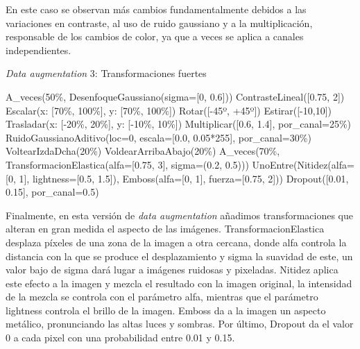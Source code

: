 En este caso se observan más cambios fundamentalmente debidos a las variaciones en contraste, al uso de ruido gaussiano y a la multiplicación, responsable de los cambios de color, ya que a veces se aplica a canales independientes. 

\begin{algorithm}[H]
    \caption{\textit{Data augmentation} 3: Transformaciones fuertes}
\begin{algorithmic}[1]
    \State A\_veces(50\%, DesenfoqueGaussiano(sigma=[0, 0.6]))
    \State ContrasteLineal([0.75, 2])
    \State Escalar(x: [70\%, 100\%], y: [70\%, 100\%])
    \State Rotar([-45º, +45º])
    \State Estirar([-10,10])
    \State Trasladar(x: [-20\%, 20\%], y: [-10\%, 10\%])
    \State Multiplicar([0.6, 1.4], por\_canal=25\%)
    \State RuidoGaussianoAditivo(loc=0, escala=[0.0, 0.05*255], por\_canal=30\%)
    \State VoltearIzdaDcha(20\%)
    \State VoldearArribaAbajo(20\%)
    \State A\_veces(70\%, TransformacionElastica(alfa=[0.75, 3], sigma=(0.2, 0.5)))
    \State UnoEntre(Nitidez(alfa=[0, 1], lightness=[0.5, 1.5]), Emboss(alfa=[0, 1], fuerza=[0.75, 2]))
    \State Dropout([0.01, 0.15], por\_canal=0.5)
\end{algorithmic}
\end{algorithm}

Finalmente, en esta versión de \textit{data augmentation} añadimos transformaciones que alteran en gran medida el aspecto de las imágenes. TransformacionElastica desplaza píxeles de una zona de la imagen a otra cercana, donde alfa controla la distancia con la que se produce el desplazamiento y sigma la suavidad de este, un valor bajo de sigma dará lugar a imágenes ruidosas y pixeladas. Nitidez aplica este efecto a la imagen y mezcla el resultado con la imagen original, la intensidad de la mezcla se controla con el parámetro alfa, mientras que el parámetro lightness controla el brillo de la imagen. Emboss da a la imagen un aspecto metálico, pronunciando las altas luces y sombras. Por último, Dropout da el valor 0 a cada pixel con una probabilidad entre 0.01 y 0.15. 

